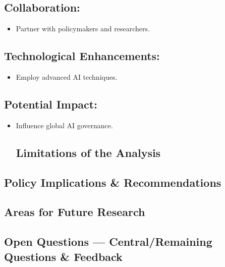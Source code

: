 \documentclass[
  letterpaper,
]{book}
\providecommand{\tightlist}{%
  \setlength{\itemsep}{0pt}\setlength{\parskip}{0pt}}
\begin{document}
\subsection{Collaboration:}\label{collaboration}

\begin{itemize}
\tightlist
\item
  Partner with policymakers and researchers.
\end{itemize}

\subsection{Technological
Enhancements:}\label{technological-enhancements}

\begin{itemize}
\tightlist
\item
  Employ advanced AI techniques.
\end{itemize}

\subsection{Potential Impact:}\label{potential-impact}

\begin{itemize}
\item
  Influence global AI governance.

  \subsection{Limitations of the
  Analysis}\label{limitations-of-the-analysis}
\end{itemize}

\subsection{Policy Implications \&
Recommendations}\label{policy-implications-recommendations}

\subsection{Areas for Future Research}\label{areas-for-future-research}

\subsection{Open Questions --- Central/Remaining Questions \&
Feedback}\label{open-questions-centralremaining-questions-feedback}
\end{document}

